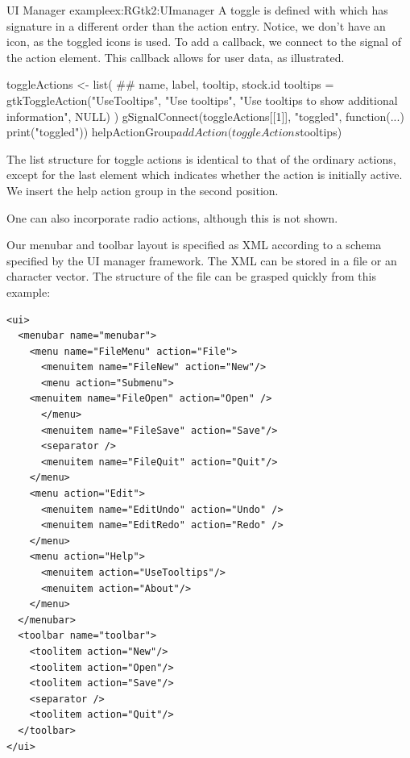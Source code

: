 \begin{example}{UI Manager example}{ex:RGtk2:UImanager}
A toggle is defined with  which has signature
in a different order than the action entry. Notice, we don't have an
icon, as the toggled icons is used.  To add a callback, we connect to
the  signal of the action element. This callback allows
for user data, as illustrated.

\begin{Schunk}
\begin{Sinput}
 toggleActions <- list(
         ## name, label, tooltip, stock.id              
         tooltips = gtkToggleAction("UseTooltips", "Use tooltips", 
           "Use tooltips to show additional information", NULL)
 )
 gSignalConnect(toggleActions[[1]], "toggled", function(...) print("toggled"))
 helpActionGroup$addAction(toggleActions$tooltips)
\end{Sinput}
\end{Schunk}
%
The list structure for toggle actions is identical to that of the
ordinary actions, except for the last element which indicates whether
the action is initially active.  We insert the help action group in
the second position.
\begin{Schunk}
\end{Schunk}
%
One can also incorporate radio actions, although this is not shown.

Our menubar and toolbar layout is specified as XML according to a
schema specified by the UI manager framework. The XML can be stored in
a file or an \R\/ character vector.  The structure of the file can be
grasped quickly from this example:
\begin{verbatim}
<ui>
  <menubar name="menubar">
    <menu name="FileMenu" action="File">
      <menuitem name="FileNew" action="New"/>
      <menu action="Submenu">
	<menuitem name="FileOpen" action="Open" />
      </menu>
      <menuitem name="FileSave" action="Save"/>
      <separator />
      <menuitem name="FileQuit" action="Quit"/>
    </menu>
    <menu action="Edit">
      <menuitem name="EditUndo" action="Undo" />
      <menuitem name="EditRedo" action="Redo" />
    </menu>
    <menu action="Help">
      <menuitem action="UseTooltips"/>
      <menuitem action="About"/>
    </menu>
  </menubar>
  <toolbar name="toolbar">
    <toolitem action="New"/>
    <toolitem action="Open"/>
    <toolitem action="Save"/>
    <separator />
    <toolitem action="Quit"/>
  </toolbar>
</ui>
\end{verbatim}


\end{example}
